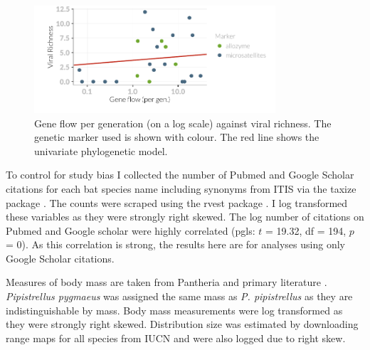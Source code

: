 \begin{knitrout}\footnotesize
{}\color{fgcolor}\begin{figure}[t]

{\centering \includegraphics[width=0.8\textwidth]{figure/fstRawData-1} 

}

\caption[Gene flow per generation (on a log scale) against viral richness]{Gene flow per generation (on a log scale) against viral richness. The genetic marker used is shown with colour. The red line shows the univariate phylogenetic model.}\label{fig:fstRawData}
\end{figure}


\end{knitrout}

To control for study bias I collected the number of Pubmed and Google Scholar citations for each bat species name including synonyms from ITIS \cite{itis} via the taxize package \cite{chamberlain2013taxize}.
The counts were scraped using the rvest package \cite{rvest}.
I log transformed these variables as they were strongly right skewed.
The log number of citations on Pubmed and Google scholar were highly correlated (pgls: $t$ = 19.32, df = 194, $p$ = 0).
As this correlation is strong, the results here are for analyses using only Google Scholar citations.

Measures of body mass are taken from Pantheria \cite{jones2009pantheria} and primary literature \cite{canals2005relative, arita1993rarity, lopez2014echolocation, orr2013does, lim2001bat, aldridge1987turning, ma2003dietary, owen2003home, henderson2008movements, heaney2012nyctalus, oleksy2015high, zhang2009recent}. 
\emph{Pipistrellus pygmaeus} was assigned the same mass as \emph{P. pipistrellus} as they are indistinguishable by mass.
Body mass measurements were log transformed as they were strongly right skewed.
Distribution size was estimated by downloading range maps for all species from IUCN \cite{iucn} and were also logged due to right skew.




